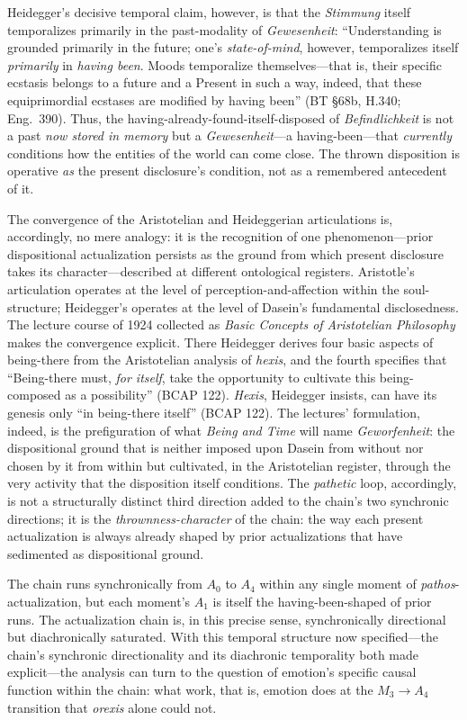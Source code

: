 \documentclass{article}
\begin{document}
Heidegger's decisive temporal claim, however, is that the \textit{Stimmung} itself temporalizes primarily in the past-modality of \textit{Gewesenheit}: ``Understanding is grounded primarily in the future; one's \textit{state-of-mind}, however, temporalizes itself \textit{primarily} in \textit{having been}. Moods temporalize themselves---that is, their specific ecstasis belongs to a future and a Present in such a way, indeed, that these equiprimordial ecstases are modified by having been'' (BT \S68b, H.340; Eng.~390). Thus, the having-already-found-itself-disposed of \textit{Befindlichkeit} is not a past \textit{now stored in memory} but a \textit{Gewesenheit}---a having-been---that \textit{currently} conditions how the entities of the world can come close. The thrown disposition is operative \textit{as} the present disclosure's condition, not as a remembered antecedent of it.

The convergence of the Aristotelian and Heideggerian articulations is, accordingly, no mere analogy: it is the recognition of one phenomenon---prior dispositional actualization persists as the ground from which present disclosure takes its character---described at different ontological registers. Aristotle's articulation operates at the level of perception-and-affection within the soul-structure; Heidegger's operates at the level of Dasein's fundamental disclosedness. The lecture course of 1924 collected as \textit{Basic Concepts of Aristotelian Philosophy} makes the convergence explicit. There Heidegger derives four basic aspects of being-there from the Aristotelian analysis of \textit{hexis}, and the fourth specifies that ``Being-there must, \textit{for itself}, take the opportunity to cultivate this being-composed as a possibility'' (BCAP 122). \textit{Hexis}, Heidegger insists, can have its genesis only ``in being-there itself'' (BCAP 122). The lectures' formulation, indeed, is the prefiguration of what \textit{Being and Time} will name \textit{Geworfenheit}: the dispositional ground that is neither imposed upon Dasein from without nor chosen by it from within but cultivated, in the Aristotelian register, through the very activity that the disposition itself conditions. The \textit{pathetic} loop, accordingly, is not a structurally distinct third direction added to the chain's two synchronic directions; it is the \textit{thrownness-character} of the chain: the way each present actualization is always already shaped by prior actualizations that have sedimented as dispositional ground.

The chain runs synchronically from $A_0$ to $A_4$ within any single moment of \textit{pathos}-actualization, but each moment's $A_1$ is itself the having-been-shaped of prior runs. The actualization chain is, in this precise sense, synchronically directional but diachronically saturated. With this temporal structure now specified---the chain's synchronic directionality and its diachronic temporality both made explicit---the analysis can turn to the question of emotion's specific causal function within the chain: what work, that is, emotion does at the $M_3 \rightarrow A_4$ transition that \textit{orexis} alone could not.
\end{document}
